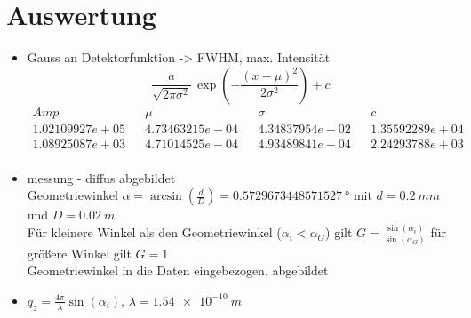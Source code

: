 \section{Auswertung}
\begin{itemize}
	\item Gauss an Detektorfunktion -> FWHM, max. Intensität
	\begin{equation*}
		\frac{a}{\sqrt{2 \pi \sigma^2}} \, \exp{\left(-\frac{\left(x-\mu \right)^2}{2 \sigma^2}\right)}+c
	\end{equation*}
	\begin{align}
		Amp && \mu && \sigma && c \\
		1.02109927e+05 && 4.73463215e-04 && 4.34837954e-02 && 1.35592289e+04 \\
		1.08925087e+03 && 4.71014525e-04 && 4.93489841e-04 && 2.24293788e+03 \\
	\end{align}
	\item messung - diffus abgebildet\\
	Geometriewinkel $\alpha = \arcsin{\left( \frac{d}{D}\right)} = \SI{0.5729673448571527}{°}$ mit $d=\SI{0.2}{mm}$ und $D=\SI{0.02}{m}$\\
	Für kleinere Winkel als den Geometriewinkel ($\alpha_i < \alpha_G$) gilt $G = \frac{\sin{(\alpha_i)}}{\sin{(\alpha_G)}}$ für größere Winkel gilt $G=1$\\
	Geometriewinkel in die Daten eingebezogen, abgebildet
	\item $q_z=\frac{4\pi}{\lambda}\sin{(\alpha_i)}$, $\lambda = \SI{1.54e-10}{m}$
\end{itemize}
